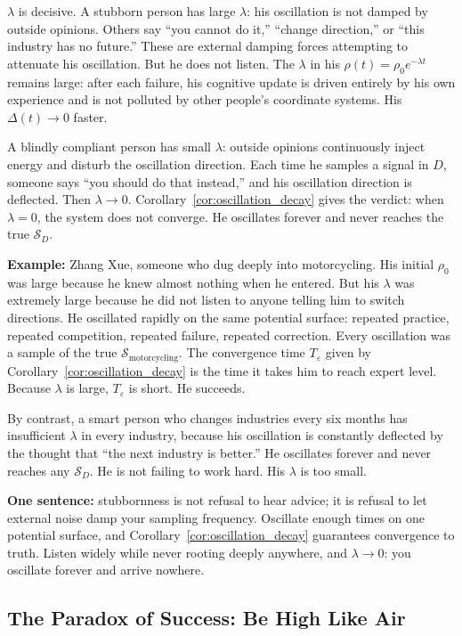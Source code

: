 \documentclass[12pt,a4paper]{article}
\theoremstyle{remark}
\begin{document}
$\lambda$ is decisive. A stubborn person has large $\lambda$: his oscillation is not damped by outside opinions. Others say ``you cannot do it,'' ``change direction,'' or ``this industry has no future.'' These are external damping forces attempting to attenuate his oscillation. But he does not listen. The $\lambda$ in his $\rho(t) = \rho_0 e^{-\lambda t}$ remains large: after each failure, his cognitive update is driven entirely by his own experience and is not polluted by other people's coordinate systems. His $\Delta(t) \to 0$ faster.

A blindly compliant person has small $\lambda$: outside opinions continuously inject energy and disturb the oscillation direction. Each time he samples a signal in $D$, someone says ``you should do that instead,'' and his oscillation direction is deflected. Then $\lambda \to 0$. Corollary~\ref{cor:oscillation_decay} gives the verdict: when $\lambda = 0$, the system does not converge. He oscillates forever and never reaches the true $\mathcal{S}_D$.

\textbf{Example:} Zhang Xue, someone who dug deeply into motorcycling. His initial $\rho_0$ was large because he knew almost nothing when he entered. But his $\lambda$ was extremely large because he did not listen to anyone telling him to switch directions. He oscillated rapidly on the same potential surface: repeated practice, repeated competition, repeated failure, repeated correction. Every oscillation was a sample of the true $\mathcal{S}_{\text{motorcycling}}$. The convergence time $T_\varepsilon$ given by Corollary~\ref{cor:oscillation_decay} is the time it takes him to reach expert level. Because $\lambda$ is large, $T_\varepsilon$ is short. He succeeds.

By contrast, a smart person who changes industries every six months has insufficient $\lambda$ in every industry, because his oscillation is constantly deflected by the thought that ``the next industry is better.'' He oscillates forever and never reaches any $\mathcal{S}_D$. He is not failing to work hard. His $\lambda$ is too small.

\textbf{One sentence:} stubbornness is not refusal to hear advice; it is refusal to let external noise damp your sampling frequency. Oscillate enough times on one potential surface, and Corollary~\ref{cor:oscillation_decay} guarantees convergence to truth. Listen widely while never rooting deeply anywhere, and $\lambda \to 0$: you oscillate forever and arrive nowhere.

\subsection{The Paradox of Success: Be High Like Air}
\end{document}
